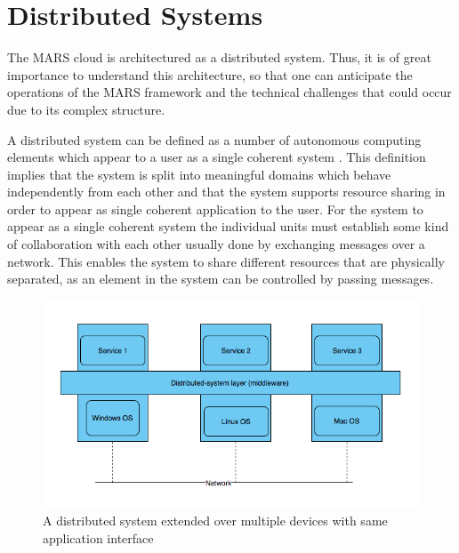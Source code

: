 \section{Distributed Systems}

    The MARS cloud is architectured as a distributed system. Thus, it is of great importance to understand
    this architecture, so that one can anticipate the operations of the MARS framework and
    the technical challenges that could occur due to its complex structure.
    \par
    A distributed system can be defined as a number of autonomous computing elements which 
    appear to a user as a single coherent system \cite[p.~2]{DistributedSystems}. This definition implies that the system is split into meaningful domains which behave 
    independently from each other and that the system supports resource sharing in order to appear as single coherent application to the user. 
    For the system to appear as a single coherent system the individual units must establish some kind of collaboration
    with each other usually done by exchanging messages over a network. This enables the system to share different resources that are physically separated, 
    as an element in the system can be controlled by passing messages.


    

    \begin{figure}[H]
        \centering \includegraphics[scale=0.5]{grafiken/distributedSystem.png}
        \caption{A distributed system extended over multiple devices with same application 
        interface \cite[p.~5]{DistributedSystems}}
        \label{fig:distributedSystem}
    \end{figure}


